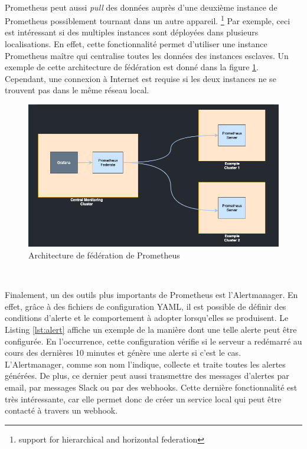 ~

\noindent
Prometheus peut aussi \textit{pull} des données auprès d'une deuxième instance de Prometheus possiblement tournant dans un autre appareil. \footnote{support for hierarchical and horizontal federation} Par exemple, ceci est intéressant si des multiples instances sont déployées dans plusieurs localisations. En effet, cette fonctionnalité permet d'utiliser une instance Prometheus maître qui centralise toutes les données des instances esclaves. Un exemple de cette architecture de fédération est donné dans la figure \ref{fig:prom_fed}. Cependant, une connexion à Internet est requise si les deux instances ne se trouvent pas dans le même réseau local.


\begin{figure}[ht!]
  \includegraphics[width=\textwidth]{img/app/prometheus_federate.png}
  \caption{Architecture de fédération de Prometheus \cite{prometheus_federation}}
  \label{fig:prom_fed}
\end{figure}

~

\noindent
Finalement, un des outils plus importants de Prometheus est l'Alertmanager. En effet, grâce à des fichiers de configuration YAML, il est possible de définir des conditions d'alerte et le comportement à adopter lorsqu'elles se produisent. Le Listing \ref{lst:alert} affiche un exemple de la manière dont une telle alerte peut être configurée. En l'occurrence, cette configuration vérifie si le serveur a redémarré au cours des dernières 10 minutes et génère une alerte si c'est le cas. L'Alertmanager, comme son nom l'indique, collecte et traite toutes les alertes générées. De plus, ce dernier peut aussi transmettre des messages d'alertes par email, par messages Slack ou par des webhooks. Cette dernière fonctionnalité est très intéressante, car elle permet donc de créer un service local qui peut être contacté à travers un webhook.

